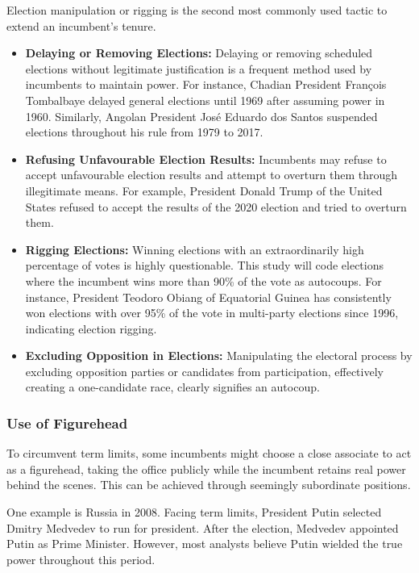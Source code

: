 \documentclass[
  12pt,
]{report}
\begin{document}
Election manipulation or rigging is the second most commonly used tactic
to extend an incumbent's tenure.

\begin{itemize}
\item
  \textbf{Delaying or Removing Elections:} Delaying or removing
  scheduled elections without legitimate justification is a frequent
  method used by incumbents to maintain power. For instance, Chadian
  President François Tombalbaye delayed general elections until 1969
  after assuming power in 1960. Similarly, Angolan President José
  Eduardo dos Santos suspended elections throughout his rule from 1979
  to 2017.
\item
  \textbf{Refusing Unfavourable Election Results:} Incumbents may refuse
  to accept unfavourable election results and attempt to overturn them
  through illegitimate means. For example, President Donald Trump of the
  United States refused to accept the results of the 2020 election and
  tried to overturn them.
\item
  \textbf{Rigging Elections:} Winning elections with an extraordinarily
  high percentage of votes is highly questionable. This study will code
  elections where the incumbent wins more than 90\% of the vote as
  autocoups. For instance, President Teodoro Obiang of Equatorial Guinea
  has consistently won elections with over 95\% of the vote in
  multi-party elections since 1996, indicating election rigging.
\item
  \textbf{Excluding Opposition in Elections:} Manipulating the electoral
  process by excluding opposition parties or candidates from
  participation, effectively creating a one-candidate race, clearly
  signifies an autocoup.
\end{itemize}

\subsubsection*{\texorpdfstring{\textbf{Use of
Figurehead}}{Use of Figurehead}}\label{use-of-figurehead}

To circumvent term limits, some incumbents might choose a close
associate to act as a figurehead, taking the office publicly while the
incumbent retains real power behind the scenes. This can be achieved
through seemingly subordinate positions.

One example is Russia in 2008. Facing term limits, President Putin
selected Dmitry Medvedev to run for president. After the election,
Medvedev appointed Putin as Prime Minister. However, most analysts
believe Putin wielded the true power throughout this period.
\end{document}
